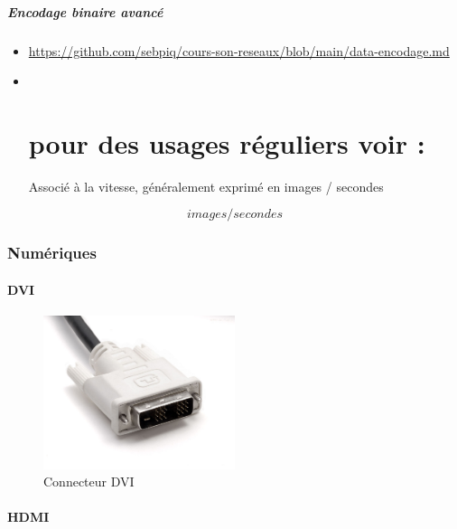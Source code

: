 \documentclass[
  french,
]{book}
\begin{document}
\hypertarget{encodage-binaire-avancuxe9}{%
\paragraph{Encodage binaire avancé}\label{encodage-binaire-avancuxe9}}

\begin{itemize}
\item
  \url{https://github.com/sebpiq/cours-son-reseaux/blob/main/data-encodage.md}
\item ~
  \hypertarget{pour-des-usages-ruxe9guliers-voir}{%
  \chapter{pour des usages réguliers voir :}\label{pour-des-usages-ruxe9guliers-voir}}

  Associé à la vitesse, généralement exprimé en images / secondes
\end{itemize}

\[
images / secondes
\]

\hypertarget{numuxe9riques}{%
\subsection{Numériques}\label{numuxe9riques}}

\hypertarget{dvi}{%
\subsubsection{DVI}\label{dvi}}

\begin{figure}
\centering
\includegraphics[width=0.5\textwidth,height=\textheight]{medias/lexique/signaux/numerique/dvi.jpg}
\caption{Connecteur DVI}
\end{figure}

\hypertarget{hdmi}{%
\subsubsection{HDMI}\label{hdmi}}
\end{document}
